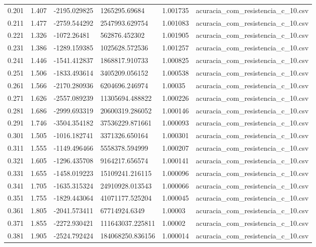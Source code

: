 \begin{table}
\begin{tabular}{llllll}
0.201 & 1.407 & -2195.029825 & 1265295.69684 & 1.001735 & acuracia\_com\_resistencia\_c\_10.csv \\
0.211 & 1.477 & -2759.544292 & 2547993.629754 & 1.001083 & acuracia\_com\_resistencia\_c\_10.csv \\
0.221 & 1.326 & -1072.26481 & 562876.452302 & 1.001905 & acuracia\_com\_resistencia\_c\_10.csv \\
0.231 & 1.386 & -1289.159385 & 1025628.572536 & 1.001257 & acuracia\_com\_resistencia\_c\_10.csv \\
0.241 & 1.446 & -1541.412837 & 1868817.910733 & 1.000825 & acuracia\_com\_resistencia\_c\_10.csv \\
0.251 & 1.506 & -1833.493614 & 3405209.056152 & 1.000538 & acuracia\_com\_resistencia\_c\_10.csv \\
0.261 & 1.566 & -2170.280936 & 6204696.246974 & 1.00035 & acuracia\_com\_resistencia\_c\_10.csv \\
0.271 & 1.626 & -2557.089239 & 11305694.488822 & 1.000226 & acuracia\_com\_resistencia\_c\_10.csv \\
0.281 & 1.686 & -2999.693319 & 20600319.286052 & 1.000146 & acuracia\_com\_resistencia\_c\_10.csv \\
0.291 & 1.746 & -3504.354182 & 37536229.871661 & 1.000093 & acuracia\_com\_resistencia\_c\_10.csv \\
0.301 & 1.505 & -1016.182741 & 3371326.650164 & 1.000301 & acuracia\_com\_resistencia\_c\_10.csv \\
0.311 & 1.555 & -1149.496466 & 5558378.594999 & 1.000207 & acuracia\_com\_resistencia\_c\_10.csv \\
0.321 & 1.605 & -1296.435708 & 9164217.656574 & 1.000141 & acuracia\_com\_resistencia\_c\_10.csv \\
0.331 & 1.655 & -1458.019223 & 15109241.216115 & 1.000096 & acuracia\_com\_resistencia\_c\_10.csv \\
0.341 & 1.705 & -1635.315324 & 24910928.013543 & 1.000066 & acuracia\_com\_resistencia\_c\_10.csv \\
0.351 & 1.755 & -1829.443064 & 41071177.525204 & 1.000045 & acuracia\_com\_resistencia\_c\_10.csv \\
0.361 & 1.805 & -2041.573411 & 67714924.6349 & 1.00003 & acuracia\_com\_resistencia\_c\_10.csv \\
0.371 & 1.855 & -2272.930421 & 111643037.225811 & 1.00002 & acuracia\_com\_resistencia\_c\_10.csv \\
0.381 & 1.905 & -2524.792424 & 184068250.836156 & 1.000014 & acuracia\_com\_resistencia\_c\_10.csv \\

\end{tabular}
\end{table}
